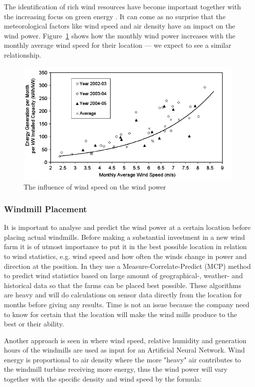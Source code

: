 The identification of rich wind resources have become important together with the increasing focus on green energy \cite{WindPowerGenerationUsingANN}. It can come as no surprise that the meteorological factors like wind speed and air density have an impact on the wind power. Figure~\ref{fig:energyGeneration} shows how the monthly wind power increases with the monthly average wind speed for their location --- we expect to see a similar relationship. 

\begin{figure}[h!]
\centering
\includegraphics[width=0.8\linewidth,natwidth=898,natheight=587]{billeder/EnergyGenerationVsWindSpeed.png}
\caption{The influence of wind speed on the wind power \cite{WindPowerGenerationUsingANN}}
\label{fig:energyGeneration}
\end{figure} 

\subsubsection{Windmill Placement}
\label{sec:windmillPlacement}
It is important to analyse and predict the wind power at a certain location before placing actual windmills. Before making a substantial investment in a new wind farm it is of utmost importance to put it in the best possible location in relation to wind statistics, e.g. wind speed and how often the winds change in power and direction at the position. In \cite{4} they use a Measure-Correlate-Predict (MCP) method to predict wind statistics based on large amount of geographical-, weather- and historical data so that the farms can be placed best possible. These algorithms are heavy and will do calculations on sensor data directly from the location for months before giving any results. Time is not an issue because the company need to know for certain that the location will make the wind mills produce to the best or their ability.

Another approach is seen in \cite{WindPowerGenerationUsingANN} where wind speed, relative humidity and generation hours of the windmills are used as input for an Artificial Neural Network. Wind energy is proportional to air density where the more "heavy" air contributes to the windmill turbine receiving more energy, thus the wind power will vary together with the specific density and wind speed by the formula:

